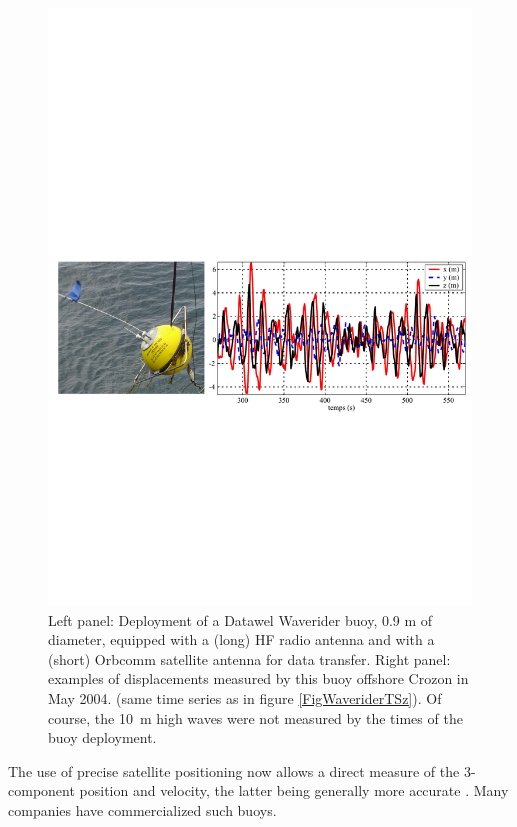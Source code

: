 \begin{figure}
\centerline{\includegraphics[width=\textwidth]{FIGS_CH_MEASUREMENTS/Exemple_DWIROISE2004all_plus.pdf}}
\label{Datawell_xyz}
\caption{Left panel: Deployment of a  Datawel Waverider buoy, 0.9 m of diameter, equipped with a (long) HF radio antenna and 
with a (short) Orbcomm satellite antenna for data transfer. Right panel: examples of displacements measured by this buoy offshore Crozon in May 2004. 
(same time series as in figure \ref{FigWaveriderTSz}). Of course, the 10~m high waves were not measured by the times of the buoy deployment.}
\end{figure}
 The use of  precise satellite positioning now allows a direct measure of the 3-component position and velocity, the latter being generally more accurate \citep{Herbers&al.2012}. Many companies have commercialized such buoys.

